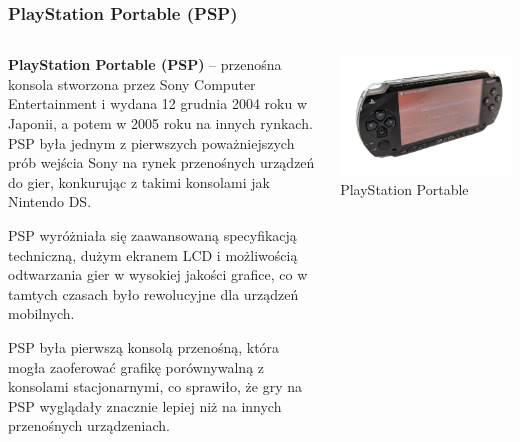\documentclass[8pt]{beamer}
\begin{document}
\begin{frame}
\frametitle{PlayStation Portable (PSP)}
\begin{columns}

\begin{column}{0.6\textwidth}
\textbf {PlayStation Portable (PSP)} – przenośna konsola stworzona przez Sony Computer Entertainment i wydana 12 grudnia 2004 roku w Japonii, a potem w 2005 roku na innych rynkach. PSP była jednym z pierwszych poważniejszych prób wejścia Sony na rynek przenośnych urządzeń do gier, konkurując z takimi konsolami jak Nintendo DS.

\vspace{0.5em} 
PSP wyróżniała się zaawansowaną specyfikacją techniczną, dużym ekranem LCD i możliwością odtwarzania gier w wysokiej jakości grafice, co w tamtych czasach było rewolucyjne dla urządzeń mobilnych.

\vspace{0.5em}
PSP była pierwszą konsolą przenośną, która mogła zaoferować grafikę porównywalną z konsolami stacjonarnymi, co sprawiło, że gry na PSP wyglądały znacznie lepiej niż na innych przenośnych urządzeniach. 

\end{column}

\begin{column}{0.35\textwidth}
        \centering
        \includegraphics[width=\textwidth]{psp.jpg} 
        {\small PlayStation Portable} 
    \end{column}
\end{columns}

\end{frame}
\end{document}
